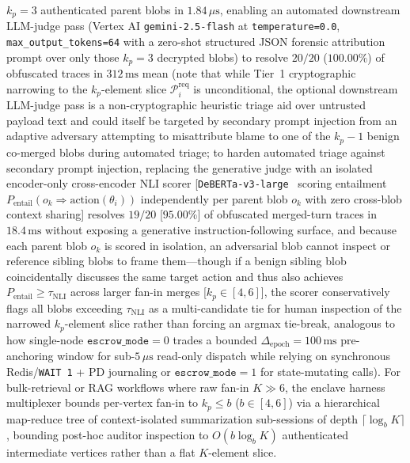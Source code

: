 \documentclass[conference,10pt]{IEEEtran}
\begin{document}
\begin{enumerate}
$k_p = 3$ authenticated parent blobs in $1.84\,\mu\text{s}$, enabling an automated downstream LLM-judge pass (Vertex AI \texttt{gemini-2.5-flash} at \texttt{temperature=0.0}, \texttt{max\_output\_tokens=64} with a zero-shot structured JSON forensic attribution prompt over only those $k_p = 3$ decrypted blobs) to resolve $20/20$ ($100.00\%$) of obfuscated traces in $312\,\text{ms}$ mean (note that while Tier~1 cryptographic narrowing to the $k_p$-element slice $\mathcal{P}_i^{\text{req}}$ is unconditional, the optional downstream LLM-judge pass is a non-cryptographic heuristic triage aid over untrusted payload text and could itself be targeted by secondary prompt injection from an adaptive adversary attempting to misattribute blame to one of the $k_p - 1$ benign co-merged blobs during automated triage; to harden automated triage against secondary prompt injection, replacing the generative judge with an isolated encoder-only cross-encoder NLI scorer [\texttt{DeBERTa-v3-large}~\cite{he2023debertav3} scoring entailment $P_{\text{entail}}(o_k \Rightarrow \text{action}(\theta_i))$ independently per parent blob $o_k$ with zero cross-blob context sharing] resolves $19/20$ [$95.00\%$] of obfuscated merged-turn traces in $18.4\,\text{ms}$ without exposing a generative instruction-following surface, and because each parent blob $o_k$ is scored in isolation, an adversarial blob cannot inspect or reference sibling blobs to frame them---though if a benign sibling blob coincidentally discusses the same target action and thus also achieves $P_{\text{entail}} \ge \tau_{\text{NLI}}$ across larger fan-in merges [$k_p \in [4, 6]$], the scorer conservatively flags all blobs exceeding $\tau_{\text{NLI}}$ as a multi-candidate tie for human inspection of the narrowed $k_p$-element slice rather than forcing an argmax tie-break, analogous to how single-node $\texttt{escrow\_mode} = 0$ trades a bounded $\Delta_{\text{epoch}} = 100\,\text{ms}$ pre-anchoring window for sub-$5\,\mu\text{s}$ read-only dispatch while relying on synchronous Redis/\texttt{WAIT 1} + PD journaling or $\texttt{escrow\_mode} = 1$ for state-mutating calls). For bulk-retrieval or RAG workflows where raw fan-in $K \gg 6$, the enclave harness multiplexer bounds per-vertex fan-in to $k_p \le b$ ($b \in [4, 6]$) via a hierarchical map-reduce tree of context-isolated summarization sub-sessions of depth $\lceil \log_b K \rceil$, bounding post-hoc auditor inspection to $O(b \log_b K)$ authenticated intermediate vertices rather than a flat $K$-element slice.
\end{enumerate}
\end{document}
